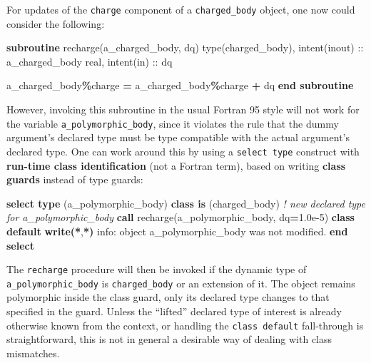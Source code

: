 \documentclass[
  paper=a4,
  ,captions=tableheading
]{scrartcl}
\newenvironment{Shaded}{\begin{snugshade}}{\end{snugshade}}
\newcommand{\CommentTok}[1]{\textcolor[rgb]{0.56,0.35,0.01}{\textit{#1}}}
\newcommand{\DataTypeTok}[1]{\textcolor[rgb]{0.13,0.29,0.53}{#1}}
\newcommand{\FloatTok}[1]{\textcolor[rgb]{0.00,0.00,0.81}{#1}}
\newcommand{\FunctionTok}[1]{\textcolor[rgb]{0.13,0.29,0.53}{\textbf{#1}}}
\newcommand{\KeywordTok}[1]{\textcolor[rgb]{0.13,0.29,0.53}{\textbf{#1}}}
\newcommand{\NormalTok}[1]{#1}
\newcommand{\OperatorTok}[1]{\textcolor[rgb]{0.81,0.36,0.00}{\textbf{#1}}}
\newcommand{\StringTok}[1]{\textcolor[rgb]{0.31,0.60,0.02}{#1}}
\begin{document}
For updates of the \texttt{charge} component of a \texttt{charged\_body}
object, one now could consider the following:

\begin{Shaded}
\begin{Highlighting}[]
\KeywordTok{subroutine}\NormalTok{ recharge(a\_charged\_body, dq)}
  \DataTypeTok{type(charged\_body)}\NormalTok{, }\DataTypeTok{intent(inout)} \DataTypeTok{::}\NormalTok{ a\_charged\_body}
  \DataTypeTok{real}\NormalTok{, }\DataTypeTok{intent(in)} \DataTypeTok{::}\NormalTok{ dq}

\NormalTok{  a\_charged\_body}\OperatorTok{\%}\NormalTok{charge }\KeywordTok{=}\NormalTok{ a\_charged\_body}\OperatorTok{\%}\NormalTok{charge }\KeywordTok{+}\NormalTok{ dq}
\KeywordTok{end subroutine}
\end{Highlighting}
\end{Shaded}

However, invoking this subroutine in the usual Fortran 95 style will not
work for the variable \texttt{a\_polymorphic\_body}, since it violates
the rule that the dummy argument's declared type must be type compatible
with the actual argument's declared type. One can work around this by
using a \texttt{select\ type} construct with \textbf{run-time class
identification} (not a Fortran term), based on writing \textbf{class
guards} instead of type guards:

\begin{Shaded}
\begin{Highlighting}[]
\KeywordTok{select type}\NormalTok{ (a\_polymorphic\_body)}
\KeywordTok{class is}\NormalTok{ (charged\_body)  }\CommentTok{! new declared type for a\_polymorphic\_body}
  \KeywordTok{call}\NormalTok{ recharge(a\_polymorphic\_body, dq}\KeywordTok{=}\FloatTok{1.0e{-}5}\NormalTok{)}
\KeywordTok{class default}
  \FunctionTok{write(*}\NormalTok{,}\FunctionTok{*)} \StringTok{\textquotesingle{}info: object a\_polymorphic\_body was not modified.\textquotesingle{}}
\KeywordTok{end select}
\end{Highlighting}
\end{Shaded}

The \texttt{recharge} procedure will then be invoked if the dynamic type
of \texttt{a\_polymorphic\_body} is \texttt{charged\_body} or an
extension of it. The object remains polymorphic inside the class guard,
only its declared type changes to that specified in the guard. Unless
the ``lifted'' declared type of interest is already otherwise known from
the context, or handling the \texttt{class\ default} fall-through is
straightforward, this is not in general a desirable way of dealing with
class mismatches.
\end{document}
